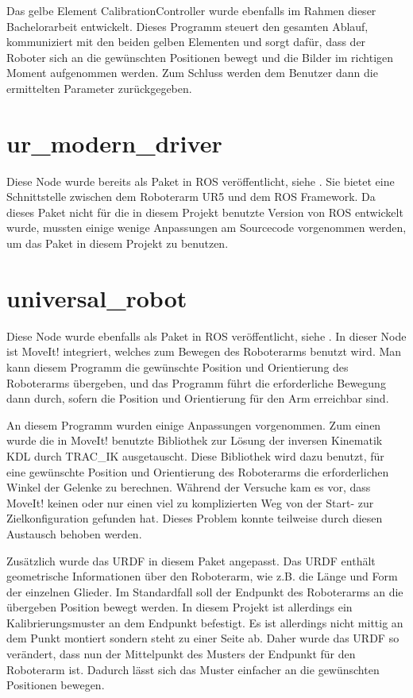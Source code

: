 Das gelbe Element CalibrationController wurde ebenfalls im Rahmen dieser Bachelorarbeit entwickelt. Dieses Programm steuert den gesamten Ablauf, kommuniziert mit den beiden gelben Elementen und sorgt dafür, dass der Roboter sich an die gewünschten Positionen bewegt und die Bilder im richtigen Moment aufgenommen werden. Zum Schluss werden dem Benutzer dann die ermittelten Parameter zurückgegeben.

\section{ur\_modern\_driver} %
\label{sec:ur_modern_driver}
Diese Node wurde bereits als Paket in ROS veröffentlicht, siehe \cite{ur_modern_driver}. Sie bietet eine Schnittstelle zwischen dem Roboterarm UR5 und dem ROS Framework. Da dieses Paket nicht für die in diesem Projekt benutzte Version von ROS entwickelt wurde, mussten einige wenige Anpassungen am Sourcecode vorgenommen werden, um das Paket in diesem Projekt zu benutzen.

\section{universal\_robot} %
\label{sec:universal_robot}
Diese Node wurde ebenfalls als Paket in ROS veröffentlicht, siehe \cite{universal_robot}. In dieser Node ist MoveIt! integriert, welches zum Bewegen des Roboterarms benutzt wird. Man kann diesem Programm die gewünschte Position und Orientierung des Roboterarms übergeben, und das Programm führt die erforderliche Bewegung dann durch, sofern die Position und Orientierung für den Arm erreichbar sind.

An diesem Programm wurden einige Anpassungen vorgenommen. Zum einen wurde die in MoveIt! benutzte Bibliothek zur Lösung der inversen Kinematik KDL durch TRAC\_IK ausgetauscht. Diese Bibliothek wird dazu benutzt, für eine gewünschte Position und Orientierung des Roboterarms die erforderlichen Winkel der Gelenke zu berechnen. Während der Versuche kam es vor, dass MoveIt! keinen oder nur einen viel zu komplizierten Weg von der Start- zur Zielkonfiguration gefunden hat. Dieses Problem konnte teilweise durch diesen Austausch behoben werden.

Zusätzlich wurde das URDF in diesem Paket angepasst. Das URDF enthält geometrische Informationen über den Roboterarm, wie z.B. die Länge und Form der einzelnen Glieder. Im Standardfall soll der Endpunkt des Roboterarms an die übergeben Position bewegt werden. In diesem Projekt ist allerdings ein Kalibrierungsmuster an dem Endpunkt befestigt. Es ist allerdings nicht mittig an dem Punkt montiert sondern steht zu einer Seite ab. Daher wurde das URDF so verändert, dass nun der Mittelpunkt des Musters der Endpunkt für den Roboterarm ist. Dadurch lässt sich das Muster einfacher an die gewünschten Positionen bewegen.


